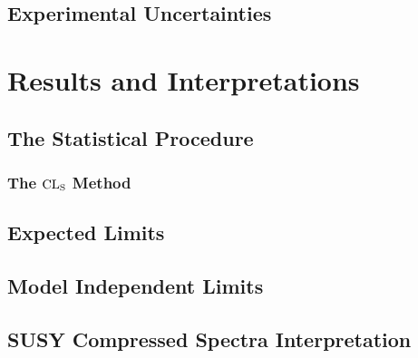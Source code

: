 \documentclass[10pt,twoside,cucitura,classica,english,openany]{toptesi}
\begin{document}
\subsection{Experimental Uncertainties}
\label{sec:exper-uncert}



\section{Results and Interpretations}
\label{sec:results}




% 

\subsection{The Statistical Procedure}
\label{sec:stat-proc}



\subsubsection{The $\mathrm{CL}_\mathrm{S}$ Method}
\label{sec:cls-method}



\subsection{Expected Limits}
\label{sec:expected-limits}



\subsection{Model Independent Limits}
\label{sec:model-indep-limits}



\subsection{SUSY Compressed Spectra Interpretation}
\label{sec:interpretation}
\end{document}
